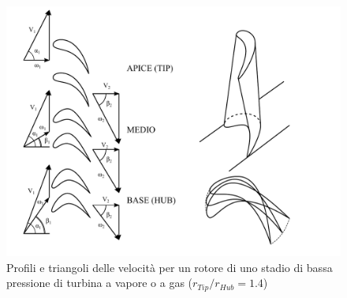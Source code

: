 \begin{figure}
\centering
  \includegraphics[width=.8\textwidth]{fig/TurbVortLib.pdf}
\caption{Profili e triangoli delle velocità per un rotore di uno stadio di bassa pressione di turbina a vapore o a gas ($r_{Tip}/r_{Hub} =1.4$)}
\label{fig:TurbVortLib}
\end{figure}
